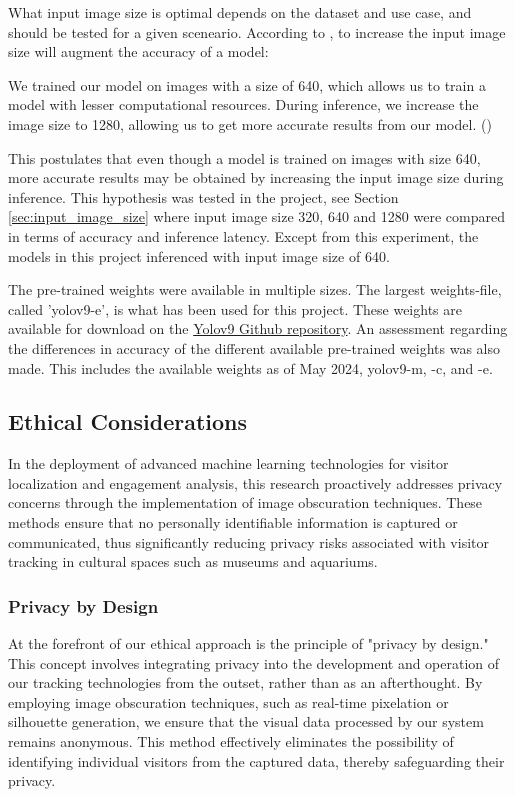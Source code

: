 What input image size is optimal depends on the dataset and use case, and should be tested for a given sceneario. According to \citeauthor{ga2024roboflow_custom_dataset}, to increase the input image size will augment the accuracy of a model:

\begin{myquote}
    We trained our model on images with a size of 640, which allows us to train a model with lesser computational resources. During inference, we increase the image size to 1280, allowing us to get more accurate results from our model. (\cite{ga2024roboflow_custom_dataset})
\end{myquote}

This postulates that even though a model is trained on images with size 640, more accurate results may be obtained by increasing the input image size during inference. This hypothesis was tested in the project, see Section \ref{sec:input_image_size} where input image size 320, 640 and 1280 were compared in terms of accuracy and inference latency. Except from this experiment, the models in this project inferenced with input image size of 640.

The pre-trained weights were available in multiple sizes. The largest weights-file, called 'yolov9-e', is what has been used for this project. These weights are available for download on the \href{https://github.com/WongKinYiu/yolov9}{Yolov9 Github repository}. An assessment regarding the differences in accuracy of the different available pre-trained weights was also made. This includes the available weights as of May 2024, yolov9-m, -c, and -e.

\subsection{Ethical Considerations}
In the deployment of advanced machine learning technologies for visitor localization and engagement analysis, this research proactively addresses privacy concerns through the implementation of image obscuration techniques. These methods ensure that no personally identifiable information is captured or communicated, thus significantly reducing privacy risks associated with visitor tracking in cultural spaces such as museums and aquariums.

\subsubsection{Privacy by Design}
At the forefront of our ethical approach is the principle of "privacy by design." This concept involves integrating privacy into the development and operation of our tracking technologies from the outset, rather than as an afterthought. By employing image obscuration techniques, such as real-time pixelation or silhouette generation, we ensure that the visual data processed by our system remains anonymous. This method effectively eliminates the possibility of identifying individual visitors from the captured data, thereby safeguarding their privacy.

